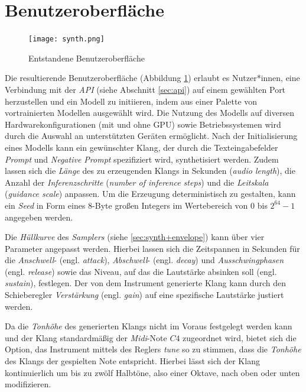 \documentclass[
  a4paper,  %
  twoside,  %
  bibliography=totoc,
  headsepline,
  cleardoublepage=empty,
  parskip=half,
  draft=false
]{scrbook}
\begin{document}
\section{Benutzeroberfläche}

\begin{figure}[h]
  \centering
  \texttt{[image: synth.png]}
  \caption[Benutzeroberfläche]{Entstandene Benutzeroberfläche}
  \label{fig:synth}
\end{figure} 

Die resultierende Benutzeroberfläche (Abbildung \ref{fig:synth}) erlaubt es Nutzer*innen, eine Verbindung mit der \emph{API} (siehe Abschnitt \ref{sec:api}) auf einem gewählten Port herzustellen und ein Modell zu initiieren, indem aus einer Palette von vortrainierten Modellen ausgewählt wird. Die Nutzung des Modells auf diversen Hardwarekonfigurationen (mit und ohne GPU) sowie Betriebssystemen wird durch die Auswahl an unterstützten Geräten ermöglicht. Nach der Initialisierung eines Modells kann ein gewünschter Klang, der durch die Texteingabefelder \emph{Prompt} und \emph{Negative Prompt} spezifiziert wird, synthetisiert werden. Zudem lassen sich die \emph{Länge} des zu erzeugenden Klangs in Sekunden (\emph{audio length}), die Anzahl der \emph{Inferenzschritte} (\emph{number of inference steps}) und die \emph{Leitskala} (\emph{guidance scale}) anpassen. Um die Erzeugung deterministisch zu gestalten, kann ein \emph{Seed} in Form eines 8-Byte großen Integers im Wertebereich von $0$ bis $2^{64}-1$ angegeben werden.

Die \emph{Hüllkurve} des \emph{Samplers} (siehe \ref{sec:synth+envelope}) kann über vier Parameter angepasst werden. Hierbei lassen sich die Zeitspannen in Sekunden für die \emph{Anschwell}- (engl. \emph{attack}), \emph{Abschwell}- (engl. \emph{decay}) und \emph{Ausschwingphasen} (engl. \emph{release}) sowie das Niveau, auf das die Lautstärke absinken soll (engl. \emph{sustain}), festlegen. Der von dem Instrument generierte Klang kann durch den Schieberegler \emph{Verstärkung} (engl. \emph{gain}) auf eine spezifische Lautstärke justiert werden.

Da die \emph{Tonhöhe} des generierten Klangs nicht im Voraus festgelegt werden kann und der Klang standardmäßig der \emph{Midi}-Note $C4$ zugeordnet wird, bietet sich die Option, das Instrument mittels des Reglers \emph{tune} so zu stimmen, dass die \emph{Tonhöhe} des Klangs der gespielten Note entspricht. Hierbei lässt sich der Klang kontinuierlich um bis zu zwölf Halbtöne, also einer Oktave, nach oben oder unten modifizieren.
\end{document}
